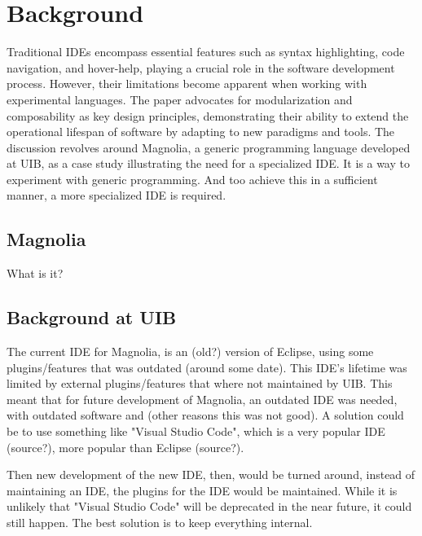 \chapter{Background}

Traditional IDEs encompass essential features such as syntax highlighting, code
navigation, and hover-help, playing a crucial role in the software development
process. However, their limitations become apparent when working with
experimental languages. The paper advocates for modularization and composability
as key design principles, demonstrating their ability to extend the operational
lifespan of software by adapting to new paradigms and tools. The discussion
revolves around Magnolia, a generic programming language developed at UIB, as a
case study illustrating the need for a specialized IDE. It is a way to experiment
with generic programming. And too achieve this in a sufficient manner, a more
specialized IDE is required.

\section{Magnolia}

What is it?

\section{Background at UIB}

The current IDE for Magnolia, is an (old?) version of Eclipse, using some
plugins/features that was outdated (around some date). This IDE's lifetime was
limited by external plugins/features that where not maintained by UIB. This
meant that for future development of Magnolia, an outdated IDE was needed, with
outdated software and (other reasons this was not good). A solution could be to
use something like "Visual Studio Code", which is a very popular IDE (source?),
more popular than Eclipse (source?).

Then new development of the new IDE, then, would be turned around, instead of
maintaining an IDE, the plugins for the IDE would be maintained. While it is
unlikely that "Visual Studio Code" will be deprecated in the near future, it
could still happen. The best solution is to keep everything internal.

